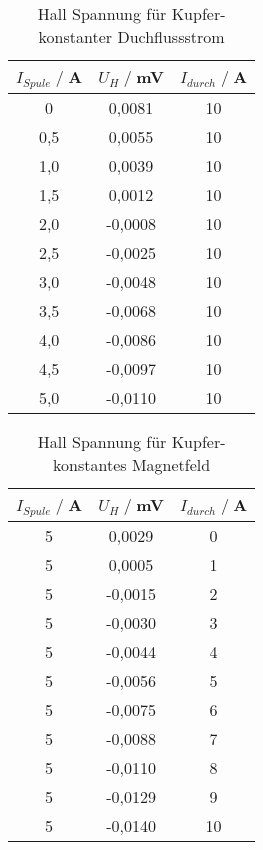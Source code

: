 \begin{table}
    \centering
    \begin{tabular}{c c c}
        \toprule
        $I_{Spule} \;/\;$A & $U_H\;/\;$mV & $I_{durch} \;/\;$A\\
        \midrule
        0                   &0,0081              &10\\
        0,5                 &0,0055              &10\\
        1,0                 &0,0039              &10\\
        1,5                 &0,0012              &10\\
        2,0                 &-0,0008             &10\\
        2,5                 &-0,0025             &10\\
        3,0                 &-0,0048             &10\\
        3,5                 &-0,0068             &10\\
        4,0                 &-0,0086             &10\\
        4,5                 &-0,0097             &10\\
        5,0                 &-0,0110             &10\\
        \bottomrule
    \end{tabular}
    \caption{Hall Spannung für Kupfer- konstanter Duchflussstrom}
    \label{tab:Cu_I}
\end{table}

\begin{table}
    \centering
    \begin{tabular}{c c c}
        \toprule
        $I_{Spule} \;/\;$A & $U_H\;/\;$mV & $I_{durch} \;/\;$A\\
        \midrule
            5                   & 0,0029&             0\\
            5                   & 0,0005&             1\\
            5                   &-0,0015&             2\\
            5                   &-0,0030&             3\\
            5                   &-0,0044&             4\\
            5                   &-0,0056&             5\\
            5                   &-0,0075&             6\\
            5                   &-0,0088&             7\\
            5                   &-0,0110&             8\\
            5                   &-0,0129&             9\\
            5                   &-0,0140&             10\\
        \bottomrule
    \end{tabular}
    \caption{Hall Spannung für Kupfer- konstantes Magnetfeld}
    \label{tab:Cu_B}
\end{table}

